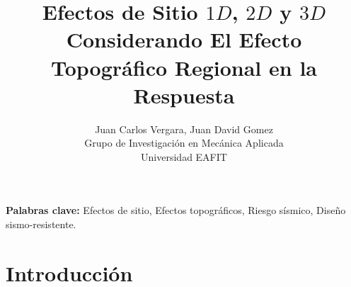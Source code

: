 \documentclass[spanish,letterpaper,12pt,twoside,openany]{article}
\title{\Large{Efectos de Sitio $1D$, $2D$ y $3D$ Considerando El Efecto Topográfico Regional en la Respuesta}}
\author{Juan Carlos Vergara, Juan David Gomez\\
Grupo de Investigación en Mecánica Aplicada\\
 Universidad EAFIT}
\begin{document}
%
%
%
%
%
\renewcommand{\tablename}{Tabla}
\renewcommand{\figurename}{Figura}
\renewcommand{\contentsname}{Tabla de contenido}
\renewcommand{\listtablename}{Lista de tablas}
\renewcommand{\listfigurename}{Lista de figuras}
\newcommand{\ask}{\textquestiondown}

\maketitle

{\bf Palabras clave:} Efectos de sitio, Efectos topográficos, Riesgo sísmico, Diseño sismo-resistente.
\newpage
{}
\tableofcontents
\listoffigures
%
%
\newpage
%
\section{Introducción}
%
%
%
%
%
\citep{Parvez2001, Panza1996, Parvez2004}
\end{document}
